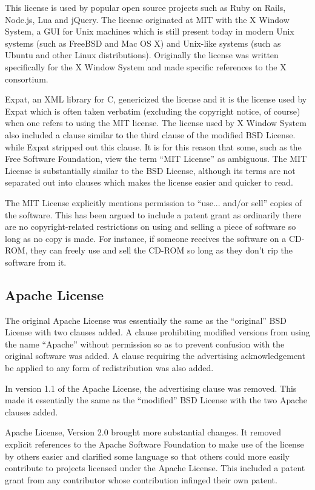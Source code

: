 \documentclass[12pt,letterpaper]{article}
\begin{document}
This license is used by popular open source projects such as Ruby on Rails, Node.js, Lua and jQuery. The license originated at MIT with the X Window System, a GUI for Unix machines which is still present today in modern Unix systems (such as FreeBSD and Mac OS X) and Unix-like systems (such as Ubuntu and other Linux distributions). Originally the license was written specifically for the X Window System and made specific references to the X consortium.

Expat, an XML library for C, genericized the license and it is the license used by Expat which is often taken verbatim (excluding the copyright notice, of course) when one refers to using the MIT license. The license used by X Window System also included a clause similar to the third clause of the modified BSD License. while Expat stripped out this clause. It is for this reason that some, such as the Free Software Foundation, view the term ``MIT License'' as ambiguous. The MIT License is substantially similar to the BSD License, although its terms are not separated out into clauses which makes the license easier and quicker to read.

The MIT License explicitly mentions permission to ``use... and/or sell'' copies of the software. This has been argued to include a patent grant as ordinarily there are no copyright-related restrictions on using and selling a piece of software so long as no copy is made. For instance, if someone receives the software on a CD-ROM, they can freely use and sell the CD-ROM so long as they don't rip the software from it.

\subsection{Apache License}

The original Apache License was essentially the same as the ``original'' BSD License with two clauses added. A clause prohibiting modified versions from using the name ``Apache'' without permission so as to prevent confusion with the original software was added. A clause requiring the advertising acknowledgement be applied to any form of redistribution was also added.

In version 1.1 of the Apache License, the advertising clause was removed. This made it essentially the same as the ``modified'' BSD License with the two Apache clauses added.

Apache License, Version 2.0 brought more substantial changes. It removed explicit references to the Apache Software Foundation to make use of the license by others easier and clarified some language so that others could more easily contribute to projects licensed under the Apache License. This included a patent grant from any contributor whose contribution infinged their own patent.
\end{document}
